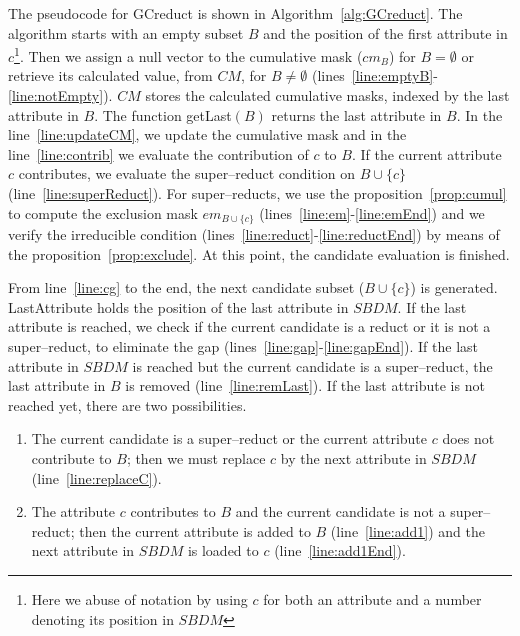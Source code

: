 \documentclass[authoryear,preprint,review,12pt]{elsarticle}
\begin{document}
		The pseudocode for GCreduct is shown in Algorithm~\ref{alg:GCreduct}. The algorithm starts with an empty subset $B$ and the position of the first attribute in $c$\footnote{Here we abuse of notation by using $c$ for both an attribute and a number denoting its position in $SBDM$}. Then we assign a null vector to the cumulative mask ($cm_B$) for $B=\emptyset$ or retrieve its calculated value, from $CM$, for $B\neq \emptyset$ (lines~\ref{line:emptyB}-\ref{line:notEmpty}). $CM$ stores the calculated cumulative masks, indexed by the last attribute in $B$. The function getLast$(B)$ returns the last attribute in $B$.
		In the line~\ref{line:updateCM}, we update the cumulative mask and in
		the line~\ref{line:contrib} we evaluate the contribution of $c$ to $B$. If the current attribute $c$ contributes, we evaluate the super--reduct condition on $B\cup \lbrace c\rbrace$ (line~\ref{line:superReduct}). For super--reducts, we use the proposition~\ref{prop:cumul} to compute the exclusion mask $em_{B\cup \lbrace c\rbrace}$ (lines~\ref{line:em}-\ref{line:emEnd}) and we verify the irreducible condition (lines~\ref{line:reduct}-\ref{line:reductEnd}) by means of the proposition~\ref{prop:exclude}. At this point, the candidate evaluation is finished.
		
		From line~\ref{line:cg} to the end, the next candidate subset ($B\cup \lbrace c\rbrace$) is generated. 
		LastAttribute holds the position of the last attribute in $SBDM$. If the last attribute is
		reached, we check if the current candidate is a reduct or it is not a super--reduct, to eliminate the gap
		(lines~\ref{line:gap}-\ref{line:gapEnd}). If the last attribute in $SBDM$ is reached but the current candidate is a super--reduct, the last attribute in $B$ is removed (line~\ref{line:remLast}). If the last attribute is 
		not reached yet, there are two possibilities. 
		\begin{enumerate}
			\item The current candidate is a super--reduct or the current attribute $c$ does not contribute to $B$; then we must replace $c$ by the next attribute in $SBDM$ (line~\ref{line:replaceC}).
			\item The attribute $c$ contributes to $B$ and the current candidate is not a super--reduct; then the current attribute is added to $B$ (line~\ref{line:add1}) and the next attribute in $SBDM$ is loaded to $c$ (line~\ref{line:add1End}).
		\end{enumerate}  
	
\end{document}
